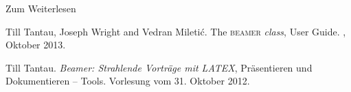 \begin{Frame}{Zum Weiterlesen}
  \begin{mybib}
      Till Tantau, Joseph Wright and Vedran Mileti\'c.
      \newblock The \textsc{beamer} \textit{class}, User Guide.
      \newblock {}, Oktober 2013.

      Till Tantau.
      \newblock \emph{Beamer: Strahlende Vorträge mit LATEX},
      \newblock Präsentieren und Dokumentieren -- Tools.
      \newblock Vorlesung vom 31. Oktober 2012.
  \end{mybib}
\end{Frame}